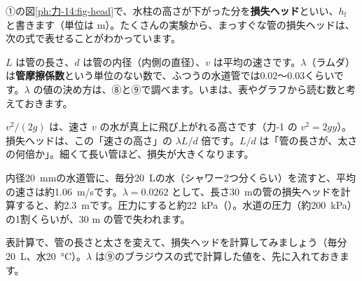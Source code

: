
\label{ph:力-14:sec4}①の図\ref{ph:力-14:fig-head}で、水柱の高さが下がった分を\textbf{損失ヘッド}といい、$h_{\mathrm f}$ と書きます（単位は m）。たくさんの実験から、まっすぐな管の損失ヘッドは、次の式で表せることがわかっています。


\noindent $L$ は管の長さ、$d$ は管の内径（内側の直径）、$v$ は平均の速さです。$\lambda$（ラムダ）は\textbf{管摩擦係数}という単位のない数で、ふつうの水道管では0.02〜0.03くらいです。$\lambda$ の値の決め方は、⑧と⑨で調べます。いまは、表やグラフから読む数と考えておきます。

\begin{phyomi}[$h_{\mathrm f}=\lambda (L/d)v^2/(2g)$]
$v^2/(2g)$ は、速さ $v$ の水が真上に飛び上がれる高さです（力-1 の $v^2=2gy$）。損失ヘッドは、この「速さの高さ」の $\lambda L/d$ 倍です。$L/d$ は「管の長さが、太さの何倍か」。細くて長い管ほど、損失が大きくなります。
\end{phyomi}

\begin{phmijika}[家の水道管]
内径\qty{20}{mm}の水道管に、毎分\qty{20}{L}の水（シャワー2つ分くらい）を流すと、平均の速さは約\qty{1.06}{m/s}です。$\lambda=0.0262$ として、長さ\qty{30}{m}の管の損失ヘッドを計算すると、約\qty{2.3}{m}です。圧力にすると約\qty{22}{kPa}（\nobreak{}\nobreak）。水道の圧力（約\qty{200}{kPa}）の1割くらいが、30 m の管で失われます。
\end{phmijika}

表計算で、管の長さと太さを変えて、損失ヘッドを計算してみましょう（毎分\qty{20}{L}、水\qty{20}{\celsius}）。$\lambda$ は⑨のブラジウスの式で計算した値を、先に入れておきます。

\begin{bkcenter}
\end{bkcenter}

